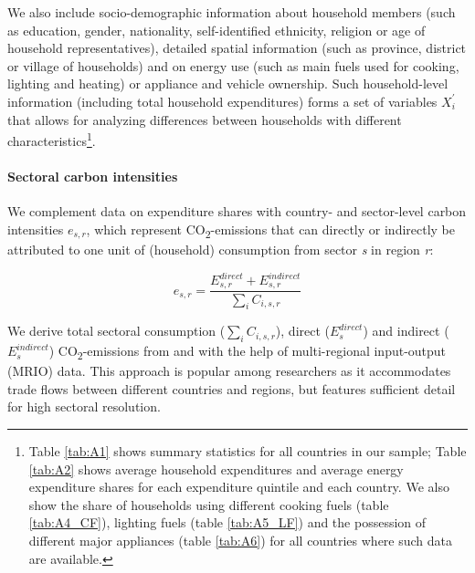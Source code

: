 \documentclass[12pt, a4paper]{article}
\begin{document}
We also include socio-demographic information about household members (such as education, gender, nationality, self-identified ethnicity, religion or age of household representatives), detailed spatial information (such as province, district or village of households) and on energy use (such as main fuels used for cooking, lighting and heating) or appliance and vehicle ownership. Such household-level information (including total household expenditures) forms a set of variables $X_{i}^{'}$ that allows for analyzing differences between households with different characteristics\footnote{Table \ref{tab:A1} shows summary statistics for all countries in our sample; Table \ref{tab:A2} shows average household expenditures and average energy expenditure shares for each expenditure quintile and each country. We also show the share of households using different cooking fuels (table \ref{tab:A4_CF}), lighting fuels (table \ref{tab:A5_LF}) and the possession of different major appliances (table \ref{tab:A6}) for all countries where such data are available.}.

\paragraph{Sectoral carbon intensities} We complement data on expenditure shares with country- and sector-level carbon intensities $e_{s,r}$, which represent CO\textsubscript{2}-emissions that can directly or indirectly be attributed to one unit of (household) consumption from sector \textit{s} in region \textit{r}:

\begin{equation}
    e_{s,r} = \frac{E_{s,r}^{direct}+E_{s,r}^{indirect}}{\sum_{i} C_{i,s,r}}
\end{equation}

We derive total sectoral consumption ($\sum_{i} C_{i,s,r}$), direct ($E_{s}^{direct}$) and indirect ($E_{s}^{indirect}$) CO\textsubscript{2}-emissions from and with the help of multi-regional input-output (MRIO) data. This approach is popular among researchers as it accommodates trade flows between different countries and regions, but features sufficient detail for high sectoral resolution. 
\end{document}
